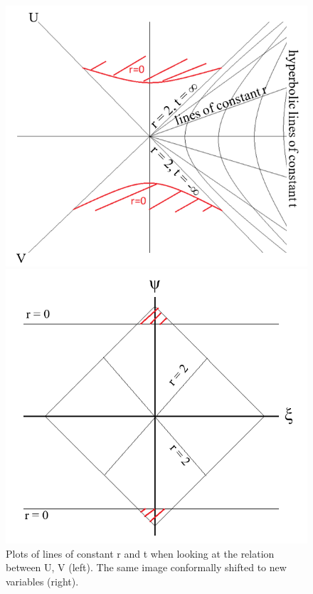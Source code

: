 \documentclass[oneside,openright,frontopenright, singlespacing]{dmathesis}
\begin{document}
\vspace{1em}
\begin{figure}[!ht]
	\centering
	\begin{minipage}{0.5\textwidth}
		\centering
		\includegraphics[width=0.9\linewidth]{img/carter-penrose1}
	\end{minipage}%
	\hfill
	\begin{minipage}{0.5\textwidth}
		\centering
		\includegraphics[width=0.9\linewidth]{img/carter-penrose2}
	\end{minipage}
	\caption{Plots of lines of constant r and t when looking at the relation between U, V (left). The same image conformally shifted to new variables (right).}
	\label{fig:Figure6.1}
\end{figure}
\end{document}
